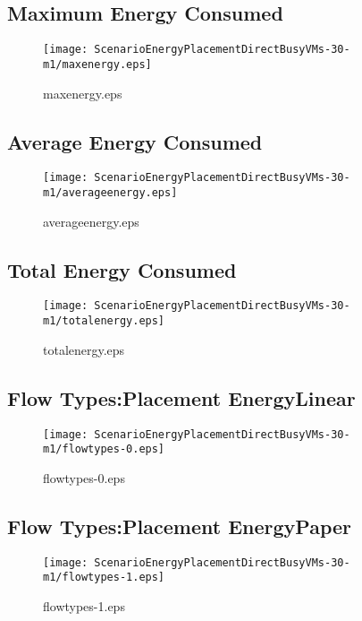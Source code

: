 \documentclass{elsart}
\begin{document}
\clearpage
\subsection{Maximum Energy Consumed}

\begin{figure}[ht]
\centering
\texttt{[image: ScenarioEnergyPlacementDirectBusyVMs-30-m1/maxenergy.eps]}
\caption{maxenergy.eps}\label{fig:maxenergy}
\end{figure}

\clearpage
\subsection{Average Energy Consumed}

\begin{figure}[ht]
\centering
\texttt{[image: ScenarioEnergyPlacementDirectBusyVMs-30-m1/averageenergy.eps]}
\caption{averageenergy.eps}\label{fig:averageenergy}
\end{figure}

\clearpage
\subsection{Total Energy Consumed}

\begin{figure}[ht]
\centering
\texttt{[image: ScenarioEnergyPlacementDirectBusyVMs-30-m1/totalenergy.eps]}
\caption{totalenergy.eps}\label{fig:totalenergy}
\end{figure}

\clearpage
\subsection{Flow Types:Placement EnergyLinear}

\begin{figure}[ht]
\centering
\texttt{[image: ScenarioEnergyPlacementDirectBusyVMs-30-m1/flowtypes-0.eps]}
\caption{flowtypes-0.eps}\label{fig:flowtypes-0}
\end{figure}

\clearpage
\subsection{Flow Types:Placement EnergyPaper}

\begin{figure}[ht]
\centering
\texttt{[image: ScenarioEnergyPlacementDirectBusyVMs-30-m1/flowtypes-1.eps]}
\caption{flowtypes-1.eps}\label{fig:flowtypes-1}
\end{figure}
\end{document}

